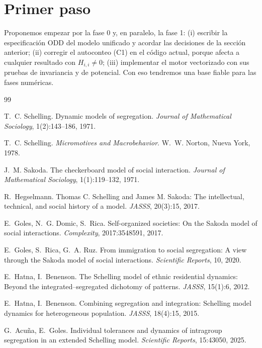 \documentclass[11pt,a4paper]{article}
\theoremstyle{plain}
\theoremstyle{definition}
\theoremstyle{remark}
\begin{document}
\section{Primer paso}

Proponemos empezar por la fase 0 y, en paralelo, la fase 1: (i) escribir la
especificación ODD del modelo unificado y acordar las decisiones de la sección
anterior; (ii) corregir el autoconteo (C1) en el código actual, porque afecta a
cualquier resultado con $H_{i,i}\neq0$; (iii) implementar el motor vectorizado
con sus pruebas de invariancia y de potencial. Con eso tendremos una base
fiable para las fases numéricas.

\begin{thebibliography}{99}

 T.~C. Schelling. Dynamic models of segregation.
\emph{Journal of Mathematical Sociology}, 1(2):143--186, 1971.

 T.~C. Schelling. \emph{Micromotives and
Macrobehavior}. W.~W. Norton, Nueva York, 1978.

 J.~M. Sakoda. The checkerboard model of social
interaction. \emph{Journal of Mathematical Sociology}, 1(1):119--132, 1971.

 R.~Hegselmann. Thomas C. Schelling and James M.
Sakoda: The intellectual, technical, and social history of a model.
\emph{JASSS}, 20(3):15, 2017.

 E.~Goles, N.~G. Domic, S.~Rica. Self-organized
societies: On the Sakoda model of social interactions. \emph{Complexity},
2017:3548591, 2017.

 E.~Goles, S.~Rica, G.~A. Ruz. From immigration to social
segregation: A view through the Sakoda model of social interactions.
\emph{Scientific Reports}, 10, 2020.

 E.~Hatna, I.~Benenson. The Schelling model of
ethnic residential dynamics: Beyond the integrated--segregated dichotomy of
patterns. \emph{JASSS}, 15(1):6, 2012.

 E.~Hatna, I.~Benenson. Combining segregation and
integration: Schelling model dynamics for heterogeneous population.
\emph{JASSS}, 18(4):15, 2015.

 G.~Acuña, E.~Goles. Individual tolerances and
dynamics of intragroup segregation in an extended Schelling model.
\emph{Scientific Reports}, 15:43050, 2025.


\end{thebibliography}
\end{document}
